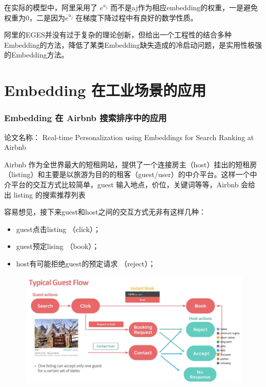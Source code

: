 \documentclass[12pt]{article}
\begin{document}
在实际的模型中，阿里采用了 $e^{a_j}$ 而不是aj作为相应embedding的权重，一是避免权重为0，二是因为$e^{a_j}$ 在梯度下降过程中有良好的数学性质。

阿里的EGES并没有过于复杂的理论创新，但给出一个工程性的结合多种Embedding的方法，降低了某类Embedding缺失造成的冷启动问题，是实用性极强的Embedding方法。

\part{Embedding 在工业场景的应用}
\section{Embedding 在 Airbnb 搜索排序中的应用
\cite{Embedding_In_Realtime_Search_In_Airbnb}\cite{How_Airbnb_Solve_Sparse_Problem_In_Embedding}}
论文名称： Real-time Personalization using Embeddings for Search Ranking at Airbnb 

Airbnb 作为全世界最大的短租网站，提供了一个连接房主（host）挂出的短租房（listing）和主要是以旅游为目的的租客（guest/user）的中介平台。这样一个中介平台的交互方式比较简单，guest 输入地点，价位，关键词等等，Airbnb 会给出 listing 的搜索推荐列表

容易想见，接下来guest和host之间的交互方式无非有这样几种：
\begin{itemize}
\setlength{\itemsep}{0pt}
\setlength{\parsep}{0pt}
\setlength{\parskip}{0pt}
    \item guest点击listing （click）；
    \item guest预定lising （book）；
    \item host有可能拒绝guest的预定请求 （reject）；
\end{itemize}
\begin{figure}[H]
    \centering
    \includegraphics[width=1\textwidth]{fig/Airbnb_User_Interaction.png}
\end{figure}
\end{document}
